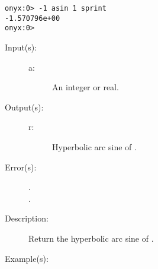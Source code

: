 \begin{description}
\begin{description}
\begin{verbatim}
onyx:0> -1 asin 1 sprint
-1.570796e+00
onyx:0>
		\end{verbatim}
	\end{description}
\label{systemdict:asinh}
\item[{\onyxop{a}{asinh}{r}}: ]
	\begin{description}\item[]
	\item[Input(s): ]
		\begin{description}\item[]
		\item[a: ]
			An integer or real.
		\end{description}
	\item[Output(s): ]
		\begin{description}\item[]
		\item[r: ]
			Hyperbolic arc sine of .
		\end{description}
	\item[Error(s): ]
		\begin{description}\item[]
		\item[.]
		\item[.]
		\end{description}
	\item[Description: ]
		Return the hyperbolic arc sine of .
	\item[Example(s): ]\begin{verbatim}


\end{verbatim}
\end{description}
\end{description}
